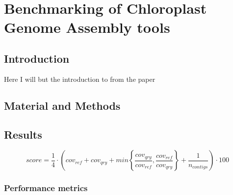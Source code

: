 
\chapter{Benchmarking of Chloroplast Genome Assembly tools } %

\label{Chapter1} %


\newcommand{\keyword}[1]{\textbf{#1}}
\newcommand{\tabhead}[1]{\textbf{#1}}
\newcommand{\code}[1]{\texttt{#1}}
\newcommand{\file}[1]{\texttt{\bfseries#1}}
\newcommand{\option}[1]{\texttt{\itshape#1}}


\section{Introduction}

Here I will but the introduction to from the paper
\section{Material and Methods}
\section{Results}

\begin{equation}
score = \frac{1}{4} \cdot \left( cov_{ref} +  cov_{qry} + min\left\{ \frac{cov_{qry}}{cov_{ref}}, \frac{cov_{ref}}{cov_{qry}}\right\} + \frac{1}{n_{contigs} }\right) \cdot 100 
\label{eqn:score_ass}
\end{equation}

\subsection{Performance metrics}


